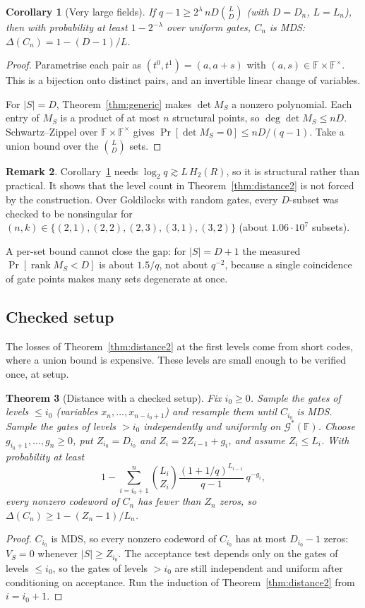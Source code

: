 \documentclass[11pt]{article}
\newtheorem{theorem}{Theorem}[section]
\newtheorem{corollary}[theorem]{Corollary}
\theoremstyle{definition}
\newtheorem{remark}[theorem]{Remark}
\newcommand{\F}{\mathbb{F}}
\newcommand{\Gs}{\mathcal{G}^{*}}
\begin{document}
\begin{corollary}[Very large fields]\label{cor:generic}
If $q-1\ge2^{\lambda}\,nD\binom{L}{D}$ (with $D=D_n$, $L=L_n$), then with probability at least
$1-2^{-\lambda}$ over uniform gates, $C_n$ is MDS: $\Delta(C_n)=1-(D-1)/L$.
\end{corollary}
\begin{proof}
Parametrise each pair as $(t^0,t^1)=(a,a+s)$ with $(a,s)\in\F\times\F^\times$. This is a
bijection onto distinct pairs, and an invertible linear change of variables.

For $|S|=D$, Theorem~\ref{thm:generic} makes $\det M_S$ a nonzero polynomial. Each entry of $M_S$
is a product of at most $n$ structural points, so $\deg\det M_S\le nD$. Schwartz--Zippel over
$\F\times\F^\times$ gives $\Pr[\det M_S=0]\le nD/(q-1)$. Take a union bound over the
$\binom{L}{D}$ sets.
\end{proof}

\begin{remark}
Corollary~\ref{cor:generic} needs $\log_2q\gtrsim L\,H_2(R)$, so it is structural rather than
practical. It shows that the level count in Theorem~\ref{thm:distance2} is not forced by the
construction. Over Goldilocks with random gates, every $D$-subset was checked to be nonsingular
for $(n,k)\in\{(2,1),(2,2),(2,3),(3,1),(3,2)\}$ (about $1.06\cdot10^{7}$ subsets).

A per-set bound cannot close the gap: for $|S|=D+1$ the measured
$\Pr[\operatorname{rank}M_S<D]$ is about $1.5/q$, not about $q^{-2}$, because a single
coincidence of gate points makes many sets degenerate at once.
\end{remark}

\subsection{Checked setup}

The losses of Theorem~\ref{thm:distance2} at the first levels come from short codes, where a union
bound is expensive. These levels are small enough to be verified once, at setup.

\begin{theorem}[Distance with a checked setup]\label{thm:checked}
Fix $i_0\ge0$. Sample the gates of levels $\le i_0$ (variables $x_n,\dots,x_{n-i_0+1}$) and resample
them until $C_{i_0}$ is MDS. Sample the gates of levels $>i_0$ independently and uniformly on $\Gs(\F)$.
Choose $g_{i_0+1},\dots,g_n\ge0$, put $Z_{i_0}=D_{i_0}$ and $Z_i=2Z_{i-1}+g_i$, and assume $Z_i\le L_i$.
With probability at least
\[
1-\sum_{i=i_0+1}^{n}\binom{L_i}{Z_i}\frac{(1+1/q)^{L_{i-1}}}{q-1}\,q^{-g_i},
\]
every nonzero codeword of $C_n$ has fewer than $Z_n$ zeros, so $\Delta(C_n)\ge1-(Z_n-1)/L_n$.
\end{theorem}
\begin{proof}
$C_{i_0}$ is MDS, so every nonzero codeword of $C_{i_0}$ has at most $D_{i_0}-1$ zeros: $V_S=0$
whenever $|S|\ge Z_{i_0}$. The acceptance test depends only on the gates of levels $\le i_0$, so the
gates of levels $>i_0$ are still independent and uniform after conditioning on acceptance. Run the
induction of Theorem~\ref{thm:distance2} from $i=i_0+1$.
\end{proof}
\end{document}
